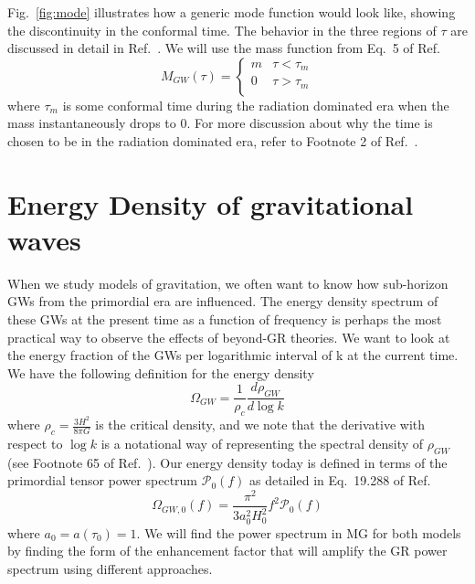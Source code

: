 \documentclass[prd,twocolumn,aps,psfig,nofootinbib,nobibnotes,superscriptaddress,preprintnumbers,times]{revtex4-2}
\begin{document}
Fig.\ \ref{fig:mode} illustrates how a generic mode function would look like, showing  the discontinuity in the conformal time. The behavior in the three regions of $\tau$ are discussed in detail in Ref.\ \cite{Fujita:2018}.
We will use the mass function from Eq.\ 5 of Ref.\ \cite{Fujita:2018}
\begin{equation}\label{eqn:mass_case}
    M_{GW}(\tau) = 
    \begin{cases}
            m & \tau < \tau_m \\
            0 & \tau > \tau_m \\
   \end{cases}
\end{equation} 
where $\tau_m$ is some conformal time during the radiation dominated era when the mass instantaneously drops to 0. For more discussion about why the time is chosen to be in the radiation dominated era, refer to Footnote 2 of Ref.\ \cite{Fujita:2018}. 

\section{Energy Density of gravitational waves}\label{sec:energy}
When we study models of gravitation, we often want to know how sub-horizon GWs from the primordial era are influenced. The energy density spectrum of these GWs at the present time as a function of frequency is perhaps the most practical way to observe the effects of beyond-GR theories. We want to look at the energy fraction of the GWs per logarithmic interval of k at the current time. We have the following definition for the energy density 
\begin{equation}\label{eqn:omega_sfm}
    \Omega_{GW} = \frac{1}{\rho_c}\frac{d \rho_{GW}} {d \log{k}}
\end{equation}
where $\rho_c = \frac{3H^2}{8\pi G}$ is the critical density, and we note that the derivative with respect to $\log k$ is a notational way of representing the spectral density of $\rho_{GW}$ (see Footnote 65 of Ref.\ \cite{Maggiore:v1}). Our energy density today is defined in terms of the primordial tensor power spectrum $\mathcal{P}_0(f)$ as detailed in Eq.\ 19.288 of Ref.\ \cite{Maggiore:v2}
\begin{equation}\label{eqn:omega_0_sfm}
    \Omega_{GW,0}(f) = \frac{\pi^2}{3a_0^2H_0^2}f^2 \mathcal{P}_0(f)
\end{equation}
where $a_0 = a(\tau_0) = 1$. We will find the power spectrum in MG for both models by finding the form of the enhancement factor that will amplify the GR power spectrum using different approaches.  
\end{document}

